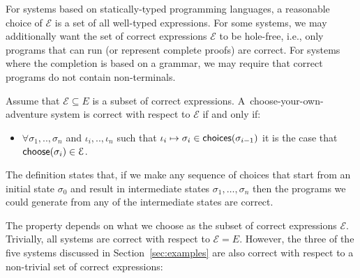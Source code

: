 \documentclass[anonymous, a4paper,UKenglish,cleveref, autoref, thm-restate]{lipics-v2021}
\newcommand{\ident}[1]{\textsf{#1}}
\newcommand{\select}{\textnormal{\ident{choose}}}
\newcommand{\choices}{\textnormal{\ident{choices}}}
\begin{document}
For systems based on statically-typed programming languages, a reasonable choice of $\mathcal{E}$
is a set of all well-typed expressions. For some systems, we may additionally want the set
of correct expressions $\mathcal{E}$ to be hole-free, i.e., only programs that can run (or
represent complete proofs) are correct. For systems where the completion is based on a grammar,
we may require that correct programs do not contain non-terminals.


\begin{definition}[Correctness]
Assume that $\mathcal{E}\subseteq E$ is a subset of correct expressions.
A~choose-your-own-adventure system is correct with respect to $\mathcal{E}$ if and only if:
\begin{itemize}
\item $\forall \sigma_1,..,\sigma_n$ and $\iota_i,..,\iota_n$ such that
  $\iota_i\mapsto\sigma_i \in \choices(\sigma_{i-1})$ it is the case
that $\select(\sigma_i) \in \mathcal{E}$.
\end{itemize}
\end{definition}

The definition states that, if we make any sequence of choices that start from an initial state
$\sigma_0$ and result in intermediate states $\sigma_1, \ldots, \sigma_n$ then the programs
we could generate from any of the intermediate states are correct.

The property depends on what we choose as the subset of correct expressions
$\mathcal{E}$. Trivially, all systems are correct with respect to $\mathcal{E}=E$.
However, the three of the five systems discussed in Section~\ref{sec:examples} are also
correct with respect to a non-trivial set of correct expressions:
\end{document}
